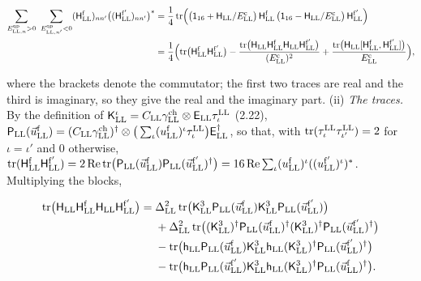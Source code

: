 \documentclass[
  10pt,
]{article}
\begin{document}
\[\begin{aligned}\sum_{E^{\rm qp}_{{\rm LL},n}>0}\ \sum_{E^{\rm qp}_{{\rm LL},n'}<0}(\mathsf H^{\rm f}_{\rm LL})_{nn'}\big((\mathsf H^{\rm f'}_{\rm LL})_{nn'}\big)^*&=\frac14\,{\rm tr}\Big(\big(\mathsf 1_{16}+\mathsf H_{\rm LL}/E^{\rm c}_{\rm LL}\big)\,\mathsf H^{\rm f}_{\rm LL}\,\big(\mathsf 1_{16}-\mathsf H_{\rm LL}/E^{\rm c}_{\rm LL}\big)\,\mathsf H^{\rm f'}_{\rm LL}\Big)\\&=\frac14\Big({\rm tr}\big(\mathsf H^{\rm f}_{\rm LL}\mathsf H^{\rm f'}_{\rm LL}\big)-\frac{{\rm tr}\big(\mathsf H_{\rm LL}\mathsf H^{\rm f}_{\rm LL}\mathsf H_{\rm LL}\mathsf H^{\rm f'}_{\rm LL}\big)}{(E^{\rm c}_{\rm LL})^2}+\frac{{\rm tr}\big(\mathsf H_{\rm LL}[\mathsf H^{\rm f}_{\rm LL},\mathsf H^{\rm f'}_{\rm LL}]\big)}{E^{\rm c}_{\rm LL}}\Big),\end{aligned}\]

where the brackets denote the commutator; the first two traces are real
and the third is imaginary, so they give the real and the imaginary
part. (ii) \emph{The traces.} By the definition of
\(\mathsf K^\iota_{\rm LL}=C_{\rm LL}\gamma^{\rm ch}_{\rm LL}\otimes\mathsf E_{\rm LL}\tau^{\rm LL}_\iota\)
(2.22),
\(\mathsf P_{\rm LL}(\vec u^{\rm f}_{\rm LL})=(C_{\rm LL}\gamma^{\rm ch}_{\rm LL})^\dagger\otimes\big(\sum_\iota(u^{\rm f}_{\rm LL})^\iota\tau^{\rm LL}_\iota\big)\mathsf E^\dagger_{\rm LL}\),
so that, with \({\rm tr}(\tau^{\rm LL}_\iota\tau^{\rm LL}_{\iota'})=2\)
for \(\iota=\iota'\) and 0 otherwise,
\({\rm tr}(\mathsf H^{\rm f}_{\rm LL}\mathsf H^{\rm f'}_{\rm LL})=2\,{\rm Re}\,{\rm tr}\big(\mathsf P_{\rm LL}(\vec u^{\rm f}_{\rm LL})\mathsf P_{\rm LL}(\vec u^{\rm f'}_{\rm LL})^\dagger\big)=16\,{\rm Re}\sum_\iota(u^{\rm f}_{\rm LL})^\iota((u^{\rm f'}_{\rm LL})^\iota)^*\).
Multiplying the blocks,

\[\begin{aligned}{\rm tr}\big(\mathsf H_{\rm LL}\mathsf H^{\rm f}_{\rm LL}\mathsf H_{\rm LL}\mathsf H^{\rm f'}_{\rm LL}\big)={}&\Delta_{\rm LL}^2\,{\rm tr}\big(\mathsf K^3_{\rm LL}\mathsf P_{\rm LL}(\vec u^{\rm f}_{\rm LL})\mathsf K^3_{\rm LL}\mathsf P_{\rm LL}(\vec u^{\rm f'}_{\rm LL})\big)\\&+\Delta_{\rm LL}^2\,{\rm tr}\big((\mathsf K^3_{\rm LL})^\dagger\mathsf P_{\rm LL}(\vec u^{\rm f}_{\rm LL})^\dagger(\mathsf K^3_{\rm LL})^\dagger\mathsf P_{\rm LL}(\vec u^{\rm f'}_{\rm LL})^\dagger\big)\\&-{\rm tr}\big(\mathsf h_{\rm LL}\mathsf P_{\rm LL}(\vec u^{\rm f}_{\rm LL})\mathsf K^3_{\rm LL}\mathsf h_{\rm LL}(\mathsf K^3_{\rm LL})^\dagger\mathsf P_{\rm LL}(\vec u^{\rm f'}_{\rm LL})^\dagger\big)\\&-{\rm tr}\big(\mathsf h_{\rm LL}\mathsf P_{\rm LL}(\vec u^{\rm f'}_{\rm LL})\mathsf K^3_{\rm LL}\mathsf h_{\rm LL}(\mathsf K^3_{\rm LL})^\dagger\mathsf P_{\rm LL}(\vec u^{\rm f}_{\rm LL})^\dagger\big).\end{aligned}\]
\end{document}
